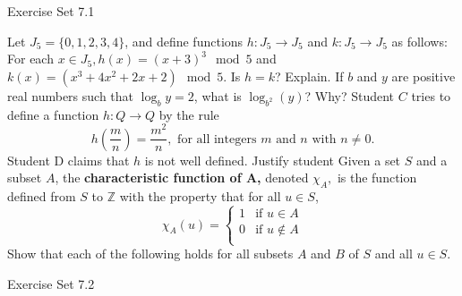 \documentclass[12pt,letterpaper, onecolumn]{exam}
\begin{document}
	\centerline{Exercise Set 7.1}
\begin{questions}
	\setcounter{question}{13}\question Let $J_5=\{0,1,2,3,4\}$, and define functions $h:J_5\rightarrow J_5$ and $k:J_5 \rightarrow J_5$ as follows: For each $x\in J_5, h(x)=(x+3)^3\mod 5$ and $k(x)=(x^3+4x^2+2x+2)\mod5.$ Is $h=k$? Explain.
	\setcounter{question}{23}\question If $b$ and $y$ are positive real numbers such that $\log_b y=2$, what is $\log_{b^2}(y)$? Why?
	\setcounter{question}{27}\question Student $C$ tries to define a function $h: Q \rightarrow Q$ by the rule 
	$$h\left(\frac{m}{n}\right)=\frac{m^2}{n}, \text{ for all integers $m$ and $n$ with $n\neq0$.}$$
	Student D claims that $h$ is not well defined. Justify student 
	\setcounter{question}{42}\question Given a set $S$ and a subset $A$, the \textbf{characteristic function of A,} denoted $\chi_A,$ is the function defined from $S$ to $\mathbb{Z}$ with the property that for all $u\in S$,
	\begin{equation*}
	\chi_A(u)=
	\begin{cases}
		1 & \text{if } u\in A\\
		0 & \text{if } u\notin A\\
\end{cases}
\end{equation*}
Show that each of the following holds for all subsets $A$ and $B$ of $S$ and all $u\in S.$
\end{questions}
	\centerline{Exercise Set 7.2}
\end{document}
